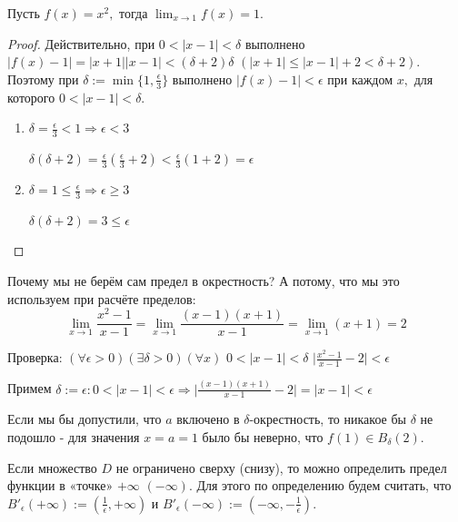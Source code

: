 	\begin{example}
		Пусть $f(x) = x^2,$ тогда $\lim_{x \to 1} f(x) = 1.$
	\end{example}
	
	\begin{proof}
		Действительно, при $0 < |x - 1| < \delta$ выполнено $|f(x) - 1| = |x + 1||x - 1| < (\delta + 2)\delta$ $(|x + 1| \leqslant |x - 1| + 2 < \delta + 2).$ Поэтому при $\delta := \min\{1, \frac{\epsilon}{3}\}$ выполнено $|f(x) - 1| < \epsilon$ при каждом $x,$ для которого $0 < |x - 1| < \delta.$
		\begin{explanation}
			\begin{enumerate}
				\item $\delta = \frac{\epsilon}{3} < 1 \Rightarrow \epsilon < 3$
				
				$\delta(\delta + 2) = \frac{\epsilon}{3}(\frac{\epsilon}{3} + 2) < \frac{\epsilon}{3} (1 + 2) = \epsilon$
				\item $\delta = 1 \leqslant \frac{\epsilon}{3} \Rightarrow \epsilon \geqslant 3$
				
				$\delta(\delta + 2) = 3 \leqslant \epsilon$
			\end{enumerate}
		\end{explanation}
	\end{proof}
	
	\begin{example}
		Почему мы не берём сам предел в окрестность? А потому, что мы это используем при расчёте пределов:
		\[ \lim_{x \to 1} \frac{x^2 - 1}{x - 1} = \lim_{x \to 1} \frac{(x - 1)(x + 1)}{x - 1} = \lim_{x \to 1} (x + 1) = 2 \]
		
		Проверка: $(\forall \epsilon > 0) (\exists \delta > 0) (\forall x)$ $0 < |x - 1| < \delta$ $\big|\frac{x^2 - 1}{x - 1} - 2\big| < \epsilon$
		
		Примем $\delta := \epsilon: 0 < |x - 1| < \epsilon \Rightarrow \big|\frac{(x - 1)(x + 1)}{x - 1} - 2\big| = |x - 1| < \epsilon$
		
		Если мы бы допустили, что $a$ включено в $\delta$-окрестность, то никакое бы $\delta$ не подошло - для значения $x = a = 1$ было бы неверно, что $f(1) \in B_{\delta}(2).$
	\end{example}
	
	\begin{mention}
		Если множество $D$ не ограничено сверху (снизу), то можно определить предел функции в «точке» $+\infty$ $(-\infty)$. Для этого по определению будем считать, что $B'_{\epsilon}(+\infty) := (\frac{1}{\epsilon}, +\infty)$ и $B'_{\epsilon}(-\infty) := (-\infty, -\frac{1}{\epsilon}).$
	\end{mention}
	
